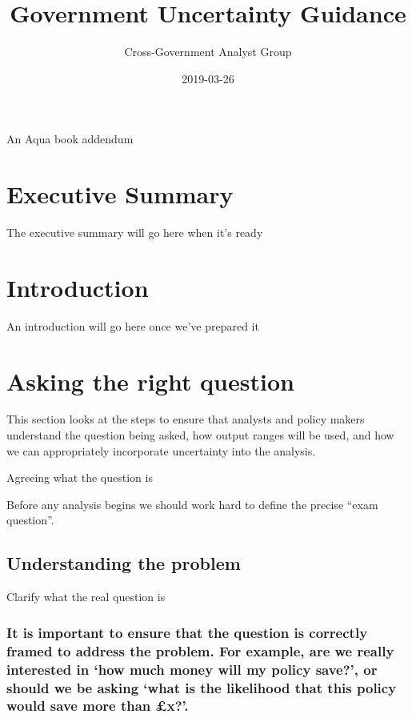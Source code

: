 \documentclass[]{book}
\title{Government Uncertainty Guidance}
\author{Cross-Government Analyst Group}
\date{2019-03-26}
\begin{document}
\maketitle

{
\setcounter{tocdepth}{1}
\tableofcontents
}
An Aqua book addendum

\chapter*{Executive Summary}\label{executive-summary}

The executive summary will go here when it's ready

\chapter*{Introduction}\label{introduction}

An introduction will go here once we've prepared it

\chapter{Asking the right question}\label{asking-the-right-question}

 This section looks at the steps to ensure that analysts and policy
makers understand the question being asked, how output ranges will be
used, and how we can appropriately incorporate uncertainty into the
analysis.

Agreeing what the question is

 Before any analysis begins we should work hard to define the precise
``exam question''.

\section{Understanding the problem}\label{understanding-the-problem}

 Clarify what the real question is

\subsection{\texorpdfstring{It is important to ensure that the question
is correctly framed to address the problem. For example, are we really
interested in `how much money will my policy save?', or should we be
asking `what is the likelihood that this policy would save more than
£x?'.}{It is important to ensure that the question is correctly framed to address the problem. For example, are we really interested in how much money will my policy save?, or should we be asking what is the likelihood that this policy would save more than £x?.}}\label{it-is-important-to-ensure-that-the-question-is-correctly-framed-to-address-the-problem.-for-example-are-we-really-interested-in-how-much-money-will-my-policy-save-or-should-we-be-asking-what-is-the-likelihood-that-this-policy-would-save-more-than-x.}
\end{document}
